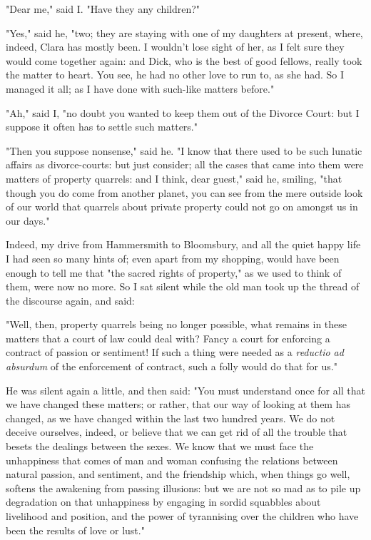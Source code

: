 "Dear me," said I. "Have they any children?"

"Yes," said he, "two; they are staying with one of my daughters at
present, where, indeed, Clara has mostly been. I wouldn't lose sight of
her, as I felt sure they would come together again: and Dick, who is the
best of good fellows, really took the matter to heart. You see, he had
no other love to run to, as she had. So I managed it all; as I have done
with such-like matters before."

"Ah," said I, "no doubt you wanted to keep them out of the Divorce
Court: but I suppose it often has to settle such matters."

"Then you suppose nonsense," said he. "I know that there used to be such
lunatic affairs as divorce-courts: but just consider; all the cases that
came into them were matters of property quarrels: and I think, dear
guest," said he, smiling, "that though you do come from another planet,
you can see from the mere outside look of our world that quarrels about
private property could not go on amongst us in our days."

Indeed, my drive from Hammersmith to Bloomsbury, and all the quiet happy
life I had seen so many hints of; even apart from my shopping, would
have been enough to tell me that "the sacred rights of property," as we
used to think of them, were now no more. So I sat silent while the old
man took up the thread of the discourse again, and said:

"Well, then, property quarrels being no longer possible, what remains in
these matters that a court of law could deal with? Fancy a court for
enforcing a contract of passion or sentiment! If such a thing were
needed as a \emph{reductio ad absurdum} of the enforcement of contract,
such a folly would do that for us."

He was silent again a little, and then said: "You must understand once
for all that we have changed these matters; or rather, that our way of
looking at them has changed, as we have changed within the last two
hundred years. We do not deceive ourselves, indeed, or believe that we
can get rid of all the trouble that besets the dealings between the
sexes. We know that we must face the unhappiness that comes of man and
woman confusing the relations between natural passion, and sentiment,
and the friendship which, when things go well, softens the awakening
from passing illusions: but we are not so mad as to pile up degradation
on that unhappiness by engaging in sordid squabbles about livelihood and
position, and the power of tyrannising over the children who have been
the results of love or lust."


